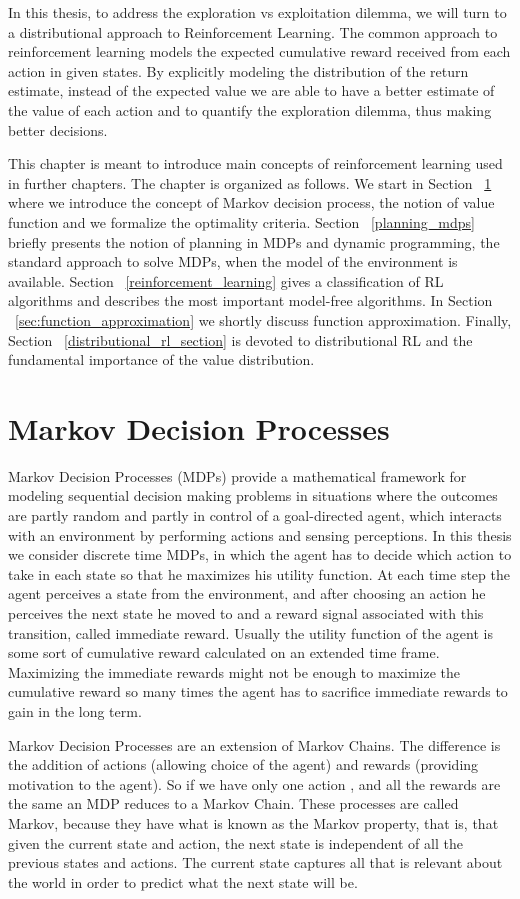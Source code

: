 In this thesis, to address the exploration vs exploitation dilemma, we will turn to a distributional approach to Reinforcement Learning. The common approach to reinforcement learning models the expected cumulative reward received from each action in given states. By explicitly modeling the distribution of the return estimate, instead of the expected value we are able to have a better estimate of the value of each action and to quantify the exploration dilemma, thus making better decisions.~\cite{Dearden98bayesianq-learning}\par
This chapter is meant to introduce main concepts of reinforcement learning used in further chapters. The chapter is organized as follows. We start in Section ~\ref{MDPs} where we introduce the concept of Markov decision process, the notion of value function and we formalize the optimality criteria. Section ~\ref{planning_mdps} briefly presents the notion of planning in MDPs and  dynamic programming, the standard approach to solve MDPs, when the model of the environment is available. Section ~\ref{reinforcement_learning} gives a classification of RL algorithms and describes the most important model-free algorithms. In Section ~\ref{sec:function_approximation} we shortly discuss function approximation. Finally, Section ~\ref{distributional_rl_section} is devoted to distributional RL and the fundamental importance of the value distribution.
\section{Markov Decision Processes} \label{MDPs}
Markov Decision Processes (MDPs) provide a mathematical framework for modeling sequential  decision making problems in situations where the outcomes are partly random and partly in control of a goal-directed agent, which interacts with an environment by performing actions and sensing perceptions. In this thesis we consider discrete time  MDPs, in which the agent has to decide which action to take in each state so that he maximizes his utility function. At each time step the agent perceives a state  from the environment, and after choosing an action he perceives the next state he moved to and a reward signal associated with this transition, called  immediate reward. Usually the utility function of the agent is some sort of cumulative reward calculated on an extended time frame. Maximizing the immediate rewards might not be enough to maximize the cumulative reward so many times the agent has to sacrifice immediate rewards to gain in the long  term.\par
Markov Decision Processes are an extension of Markov Chains. The difference is the addition of actions (allowing choice of the agent) and rewards (providing motivation to the agent). So if we have only one action , and all the rewards are the same  an MDP reduces to a Markov Chain. These processes are called Markov, because they have what is known as the Markov property, that is, that given the current state and action, the next  state is independent of all the previous states and actions. The current state captures all that is relevant about the world in order to predict what the next state will be.   
